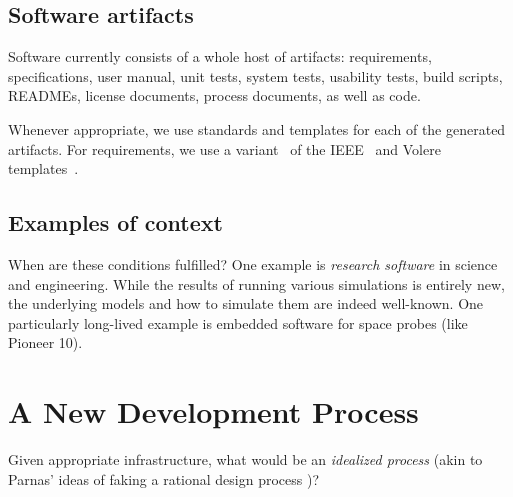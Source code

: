 \documentclass[sigconf,review,anonymous=false]{acmart}
\begin{document}
\subsection{Software artifacts}

Software currently consists of a whole host of artifacts: requirements,
specifications, user manual, unit tests, system tests, usability tests,
build scripts, READMEs, license documents, process documents, as well as
code.

Whenever appropriate, we use standards and templates for each of the
generated artifacts. For requirements, we use a variant~\cite{SmithEtAl2007}
of the IEEE~\cite{IEEE1998}
and Volere templates~\cite{RobertsonAndRobertson1999Vol}.

\subsection{Examples of context}

When are these conditions fulfilled? One example is
\emph{research software} in science and engineering. While the results of
running various simulations is entirely new, the underlying models and
how to simulate them are indeed well-known. One particularly long-lived
example is embedded software for space probes (like Pioneer 10).

\section{A New Development Process}\label{ch:process}

Given appropriate infrastructure, what would be an \emph{idealized process}
(akin to Parnas' ideas of faking a rational design process \cite{Parnas1986})?
\end{document}
